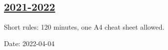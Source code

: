 \subsection[2021-2022]{\hyperref[sec:sol_kr_03_2021_2022]{2021-2022}}
\label{sec:kr_03_2021_2022} %

Short rules: 120 minutes, one A4 cheat sheet allowed. 

Date: 2022-04-04



